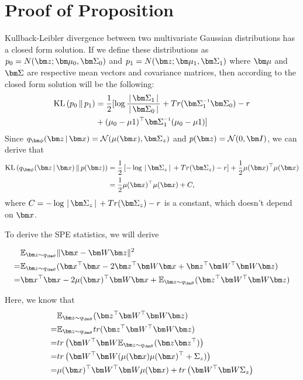 \documentclass{scrartcl}
\theoremstyle{definition}
\let\ref\Cref
\begin{document}
\section{Proof of Proposition \ref{prop: T2Q}}
\label{sec:PoofOfPropTQ}
Kullback-Leibler divergence between two multivariate Gaussian distributions has a closed form solution. 
If we define these distributions as $p_{0} = N(\mbz;\mbmu_{0}, \mbSigma_{0})$ and $p_{1} = N(\mbz;\mbmu_{1}, \mbSigma_{1})$ where $\mbmu$ and $\mbSigma$ are respective mean vectors and covariance matrices, then according to \parencite{hershey2007approximating} the closed form solution will be the following:
\begin{align*}
\KL{p_{0}}{p_{1}} & =\frac{1}{2}[\log\frac{\g\mbSigma_{1}\g}{\g\mbSigma_{0}\g}+Tr(\mbSigma_{1}\inv\mbSigma_{0})-r \\
 & +(\mu_{0}-\mu{1})^{\top}\mbSigma_{1}\inv(\mu_{0}-\mu{1}) ]
\end{align*}
Since $\encoding =\Norm(\mu(\mbx),\mbSigma_z)$ and $p(\mbz) = \Norm(0,\mbI)$, we can derive that 
\begin{align*}
\KL{\encoding}{p(\mbz)} &= \frac{1}{2}\left[ -\log\g\mbSigma_z\g + Tr(\mbSigma_z) -r \right] + \frac{1}{2} \mu(\mbx)^{\top}\mu(\mbx) \\
						&= \frac{1}{2} \mu(\mbx)^{\top}\mu(\mbx) + C,
\end{align*}
where $C = -\log\g\mbSigma_z\g + Tr(\mbSigma_z) -r $ is a constant, which doesn't depend on $\mbx$. 

To derive the SPE statistics, we will derive
  
\begin{align}
 & \mathbb{E}_{\mbz\sim q_{\mbtheta}}\|\mbx-\mbW\mbz\|^{2} \nonumber\\ 
= & \mathbb{E}_{\mbz\sim q_{\mbtheta}}(\mbx^{\top}\mbx-2\mbz^{\top}\mbW\mbx+\mbz^{\top}\mbW^{\top}\mbW\mbz) \nonumber \\
= & \mbx^{\top}\mbx-2\mu(\mbx)^{\top}\mbW\mbx+\mathbb{E}_{\mbz\sim q_{\mbtheta}}(\mbz^{\top}\mbW^{\top}\mbW\mbz)
\label{eq: spew}
\end{align}

Here, we know that 
\begin{align}
 & \mathbb{E}_{\mbz\sim q_{\mbtheta}}(\mbz^{\top}\mbW^{\top}\mbW\mbz)\nonumber \\
= & \mathbb{E}_{\mbz\sim q_{\mbtheta}}tr(\mbz^{\top}\mbW^{\top}\mbW\mbz)\nonumber \\
= & tr\left(\mbW^{\top}\mbW\mathbb{E}_{\mbz\sim q_{\mbtheta}}(\mbz\mbz^{\top})\right)\nonumber \\
= & tr\left(\mbW^{\top}\mbW(\mu(\mbx)\mu(\mbx)^{\top}+\Sigma_{z})\right) \nonumber \\
= & \mu(\mbx)^{\top}\mbW^{\top}\mbW\mu(\mbx)+tr\left(\mbW^{\top}\mbW\Sigma_{z}\right) 
\label{eq: tracezwwz}
\end{align}
\end{document}
